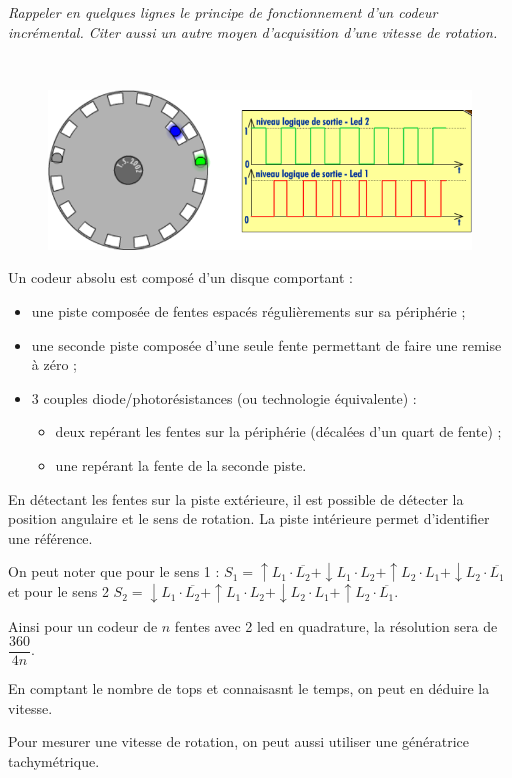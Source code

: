 \documentclass[10pt,fleqn]{article} %
\begin{document}
\subparagraph{\label{q_02}}\textit{Rappeler en quelques lignes le principe de fonctionnement d’un codeur incrémental. Citer aussi un autre moyen d’acquisition d’une vitesse de rotation.}
\ifprof
\begin{corrige} ~\\

\begin{figure}[H]
\centering
\includegraphics[width=0.7\linewidth]{cor_01}
\end{figure}

Un codeur absolu est composé d’un disque comportant :
\begin{itemize}
\item une piste composée de fentes espacés régulièrements sur sa périphérie ;
\item une seconde piste composée d’une seule fente permettant de faire une remise à zéro ;
\item 3 couples diode/photorésistances (ou technologie équivalente) :
\begin{itemize}
\item deux repérant les fentes sur la périphérie (décalées d’un quart de fente) ;
\item une repérant la fente de la seconde piste.
\end{itemize}
\end{itemize}
En détectant les fentes sur la piste extérieure, il est possible de détecter la position angulaire et le sens de rotation. 
La piste intérieure permet d’identifier une référence.

On peut noter que pour le sens 1 : 
$S_1 = \uparrow L_1 \cdot \overline{L_2} + \downarrow L_1 \cdot {L_2} +  \uparrow L_2 \cdot {L_1} + \downarrow L_2 \cdot \overline{L_1}$ et pour le sens 2
$S_2 = \downarrow L_1 \cdot \overline{L_2} + \uparrow L_1 \cdot {L_2} +  \downarrow L_2 \cdot {L_1} + \uparrow L_2 \cdot \overline{L_1}$.

Ainsi pour un codeur de $n$ fentes avec 2 led en quadrature, la résolution sera de $\dfrac{360}{4n}$.

En comptant le nombre de tops et connaisasnt le temps, on peut en déduire la vitesse. 

Pour mesurer une vitesse de rotation, on peut aussi utiliser une génératrice tachymétrique. 

\end{corrige}
\else
\fi
\end{document}
